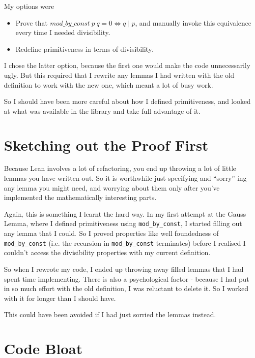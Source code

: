 \documentclass[pagesize=a4]{scrreprt}
\begin{document}
My options were 

\begin{itemize}
    \item Prove that $mod\_by\_const\ p\ q = 0 \iff q \mid p$, and manually invoke this equivalence every time I needed divisibility.
    \item Redefine primitiveness in terms of divisibility.
\end{itemize}

I chose the latter option, because the first one would make the code unnecessarily ugly. But this required that I rewrite any lemmas I had written with the old definition to work with the new one, which meant a lot of busy work. 

So I should have been more careful about how I defined primitiveness, and looked at what was available in the library and take full advantage of it. 

\section{Sketching out the Proof First}

Because Lean involves a lot of refactoring, you end up throwing a lot of little lemmas you have written out. So it is worthwhile just specifying and ``sorry''-ing any lemma you might need, and worrying about them only after you've implemented the mathematically interesting parts. 

Again, this is something I learnt the hard way. In my first attempt at the Gauss Lemma, where I defined primitiveness using \texttt{mod\_by\_const}, I started filling out any lemma that I could. So I proved properties like well foundedness of \texttt{mod\_by\_const} (i.e. the recursion in \texttt{mod\_by\_const} terminates) before I realised I couldn't access the divisibility properties with my current definition. 

So when I rewrote my code, I ended up throwing away filled lemmas that I had spent time implementing. There is also a psychological factor - because I had put in so much effort with the old definition, I was reluctant to delete it. So I worked with it for longer than I should have. 

This could have been avoided if I had just sorried the lemmas instead.

\section{Code Bloat}
\end{document}
